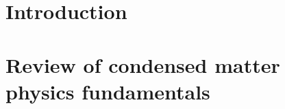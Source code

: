\chapter*{Introduction}


\chapter{Review of condensed matter physics fundamentals}
\label{ch:review}


